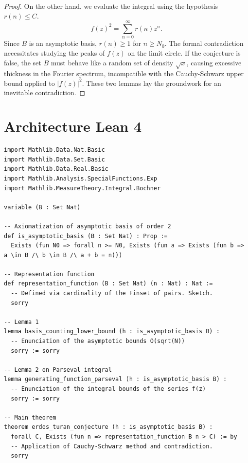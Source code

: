 \documentclass[11pt,a4paper]{article}
\begin{document}
\begin{proof}
On the other hand, we evaluate the integral using the hypothesis $r(n) \le C$.
\begin{equation}
f(z)^2 = \sum_{n=0}^\infty r(n) z^n.
\end{equation}
Since $B$ is an asymptotic basis, $r(n) \ge 1$ for $n \ge N_0$.
The formal contradiction necessitates studying the peaks of $f(z)$ on the limit circle. If the conjecture is false, the set $B$ must behave like a random set of density $\sqrt{x}$, causing excessive thickness in the Fourier spectrum, incompatible with the Cauchy-Schwarz upper bound applied to $|f(z)|^2$.
These two lemmas lay the groundwork for an inevitable contradiction.
\end{proof}
\section{Architecture Lean 4}
\begin{verbatim}
import Mathlib.Data.Nat.Basic
import Mathlib.Data.Set.Basic
import Mathlib.Data.Real.Basic
import Mathlib.Analysis.SpecialFunctions.Exp
import Mathlib.MeasureTheory.Integral.Bochner

variable (B : Set Nat)

-- Axiomatization of asymptotic basis of order 2
def is_asymptotic_basis (B : Set Nat) : Prop :=
  Exists (fun N0 => forall n >= N0, Exists (fun a => Exists (fun b => a \in B /\ b \in B /\ a + b = n)))

-- Representation function
def representation_function (B : Set Nat) (n : Nat) : Nat :=
  -- Defined via cardinality of the Finset of pairs. Sketch.
  sorry

-- Lemma 1
lemma basis_counting_lower_bound (h : is_asymptotic_basis B) :
  -- Enunciation of the asymptotic bounds O(sqrt(N))
  sorry := sorry

-- Lemma 2 on Parseval integral
lemma generating_function_parseval (h : is_asymptotic_basis B) :
  -- Enunciation of the integral bounds of the series f(z)
  sorry := sorry

-- Main theorem
theorem erdos_turan_conjecture (h : is_asymptotic_basis B) :
  forall C, Exists (fun n => representation_function B n > C) := by
  -- Application of Cauchy-Schwarz method and contradiction.
  sorry
\end{verbatim}
\end{document}
